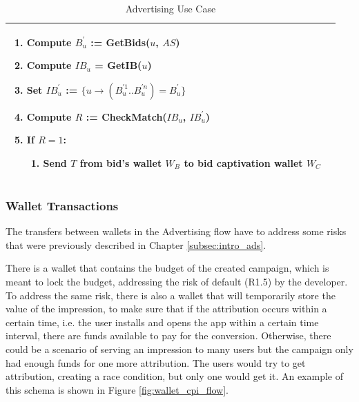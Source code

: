 \begin{table}[H]
\begin{tabular}{|p{}p{}|}
\begin{itemize}
\end{itemize}
\begin{enumerate}
	\item Compute $B^{'}_{u}$ := \textsf{GetBids}($u$, $AS$)
	\item Compute $IB_u$ = \textsf{GetIB}($u$)
	\item Set $IB^{'}_{u}$ := $\{u \to (B^{'1}_{u}..B^{'n}_{u}) = B^{'}_{u}\}$
	\item Compute $R$ := \textsf{CheckMatch}($IB_u$, $IB^{'}_{u}$)
	\item If $R = 1$:
	\begin{enumerate}
		\item Send $T$ from bid's wallet $W_B$ to bid captivation wallet $W_C$
	\end{enumerate}
\end{enumerate} & \\
\hline
\end{tabular}
\caption{Advertising Use Case}
\label{table: ads_use_case}
\end{table}


\subsubsection{Wallet Transactions}

The transfers between wallets in the Advertising flow have to address some risks that were previously described in Chapter \ref{subsec:intro_ads}.

There is a wallet that contains the budget of the created campaign, which is meant to lock the budget, addressing the risk of default (R1.5) by the developer. To address the same risk, there is also a wallet that will temporarily store the value of the impression, to make sure that if the attribution occurs within a certain time, i.e. the user installs and opens the app within a certain time interval, there are funds available to pay for the conversion. Otherwise, there could be a scenario of serving an impression to many users but the campaign only had enough funds for one more attribution. The users would try to get attribution, creating a race condition, but only one would get it. An example of this schema is shown in Figure \ref{fig:wallet_cpi_flow}.

